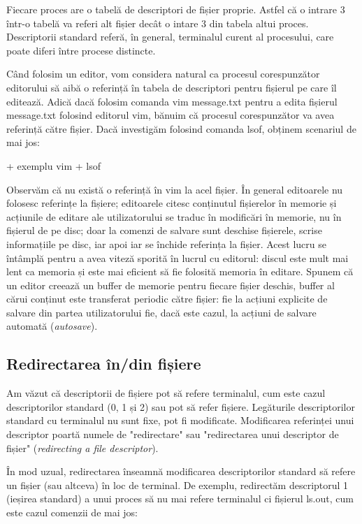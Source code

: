 Fiecare proces are o tabelă de descriptori de fișier proprie. Astfel că o
intrare 3 într-o tabelă va referi alt fișier decât o intare 3 din tabela altui
proces. Descriptorii standard referă, în general, terminalul curent al
procesului, care poate diferi între procese distincte.

Când folosim un editor, vom considera natural ca procesul corespunzător
editorului să aibă o referință în tabela de descriptori pentru fișierul pe care
îl editează. Adică dacă folosim comanda vim message.txt pentru a edita fișierul
message.txt folosind editorul vim, bănuim că procesul corespunzător va avea
referință către fișier. Dacă investigăm folosind comanda lsof, obținem scenariul
de mai jos:

+ exemplu vim + lsof

Observăm că nu există o referință în vim la acel fișier. În general editoarele
nu folosesc referințe la fișiere; editoarele citesc conținutul fișierelor în
memorie și acțiunile de editare ale utilizatorului se traduc în modificări în
memorie, nu în fișierul de pe disc; doar la comenzi de salvare sunt deschise
fișierele, scrise informațiile pe disc, iar apoi iar se închide referința la
fișier. Acest lucru se întâmplă pentru a avea viteză sporită în lucrul cu
editorul: discul este mult mai lent ca memoria și este mai eficient să fie
folosită memoria în editare. Spunem că un editor creează un buffer de memorie
pentru fiecare fișier deschis, buffer al cărui conținut este transferat periodic
către fișier: fie la acțiuni explicite de salvare din partea utilizatorului fie,
dacă este cazul, la acțiuni de salvare automată (\textit{autosave}).

\subsection{Redirectarea în/din fișiere}

Am văzut că descriptorii de fișiere pot să refere terminalul, cum este cazul
descriptorilor standard (0, 1 și 2) sau pot să refer fișiere. Legăturile
descriptorilor standard cu terminalul nu sunt fixe, pot fi modificate.
Modificarea referinței unui descriptor poartă numele de "redirectare" sau
"redirectarea unui descriptor de fișier" (\textit{redirecting a file descriptor}).

În mod uzual, redirectarea înseamnă modificarea descriptorilor standard să
refere un fișier (sau altceva) în loc de terminal. De exemplu, redirectăm
descriptorul 1 (ieșirea standard) a unui proces să nu mai refere terminalul ci
fișierul ls.out, cum este cazul comenzii de mai jos:

